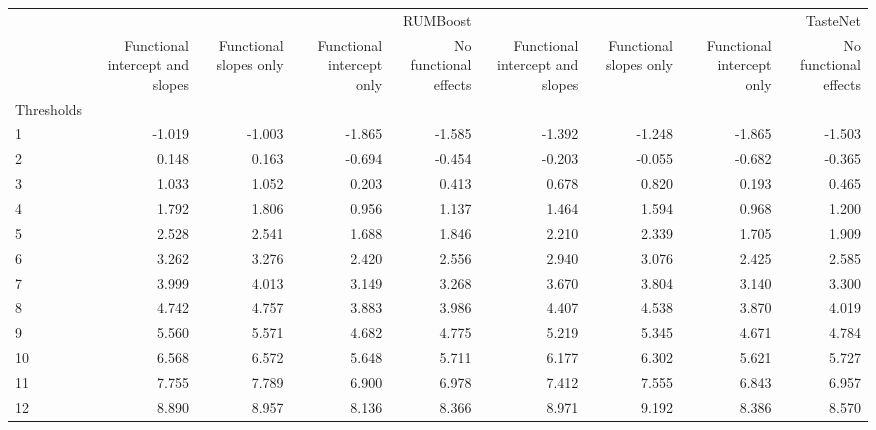 \begin{tabular}{lrrrrrrrr}
\toprule
 & \multicolumn{4}{r}{RUMBoost} & \multicolumn{4}{r}{TasteNet} \\
 & Functional intercept and slopes & Functional slopes only & Functional intercept only & No functional effects & Functional intercept and slopes & Functional slopes only & Functional intercept only & No functional effects \\
Thresholds &  &  &  &  &  &  &  &  \\
\midrule
1 & -1.019 & -1.003 & -1.865 & -1.585 & -1.392 & -1.248 & -1.865 & -1.503 \\
2 & 0.148 & 0.163 & -0.694 & -0.454 & -0.203 & -0.055 & -0.682 & -0.365 \\
3 & 1.033 & 1.052 & 0.203 & 0.413 & 0.678 & 0.820 & 0.193 & 0.465 \\
4 & 1.792 & 1.806 & 0.956 & 1.137 & 1.464 & 1.594 & 0.968 & 1.200 \\
5 & 2.528 & 2.541 & 1.688 & 1.846 & 2.210 & 2.339 & 1.705 & 1.909 \\
6 & 3.262 & 3.276 & 2.420 & 2.556 & 2.940 & 3.076 & 2.425 & 2.585 \\
7 & 3.999 & 4.013 & 3.149 & 3.268 & 3.670 & 3.804 & 3.140 & 3.300 \\
8 & 4.742 & 4.757 & 3.883 & 3.986 & 4.407 & 4.538 & 3.870 & 4.019 \\
9 & 5.560 & 5.571 & 4.682 & 4.775 & 5.219 & 5.345 & 4.671 & 4.784 \\
10 & 6.568 & 6.572 & 5.648 & 5.711 & 6.177 & 6.302 & 5.621 & 5.727 \\
11 & 7.755 & 7.789 & 6.900 & 6.978 & 7.412 & 7.555 & 6.843 & 6.957 \\
12 & 8.890 & 8.957 & 8.136 & 8.366 & 8.971 & 9.192 & 8.386 & 8.570 \\
\bottomrule
\end{tabular}
